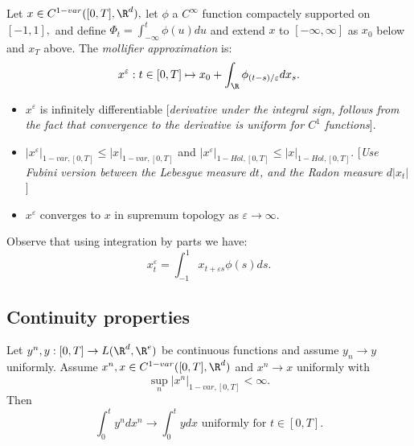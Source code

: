 \begin{exercise}
    Let $x \in C^{1-var}([0,T], \R^d),$ let $\phi$ a $C^{\infty}$ function compactely supported on $[-1,1],$ and define $\Phi_t = \int_{-\infty}^t \phi(u)du$ and extend $x$ to $[-\infty, \infty]$ as $x_0$ below and $x_T$ above.
    The \textit{mollifier approximation} is:
    \begin{equation}
        x^\varepsilon: t \in [0,T] \mapsto x_0 + \int_{\R} \phi_{(t-s) / \varepsilon} dx_s.
    \end{equation}

    \begin{itemize}
        \item $x^{\varepsilon}$ is infinitely differentiable [\textit{derivative under the integral sign, follows from the fact that convergence to the derivative is uniform for $C^1$ functions}].
        \item $|x^\varepsilon|_{1-var,[0,T]} \leq |x|_{1-var,[0,T]}$ and $|x^\varepsilon|_{1-Hol,[0,T]} \leq |x|_{1-Hol,[0,T]}.$ [\textit{Use Fubini version between the Lebesgue measure $dt$, and the Radon measure $d|x_t|$}]
        \item $x^{\varepsilon}$ converges to $x$ in supremum topology as $\varepsilon \rightarrow \infty.$
    \end{itemize}

    Observe that using integration by parts we have:
    \begin{equation}
        x_t^\varepsilon = \int_{-1}^1 x_{t + \varepsilon s} \phi(s) ds.
    \end{equation}
\end{exercise}

\subsection{Continuity properties}

\begin{prop}[Continuity]
    Let $y^n, y: [0,T] \rightarrow L(\R^d, \R^e)$ be continuous functions and assume $y_n \rightarrow y$ uniformly. Assume $x^n, x \in C^{1-var}([0,T], \R^d)$ and $x^n \rightarrow x$ uniformly with
    \begin{equation}
        \sup_n |x^n|_{1-var, [0,T]} < \infty.
    \end{equation} 
    Then 
    \begin{equation}
        \int_0^t y^n dx^n \rightarrow \int_0^t y dx \text{ uniformly for } t \in [0,T].
    \end{equation}
\end{prop}

